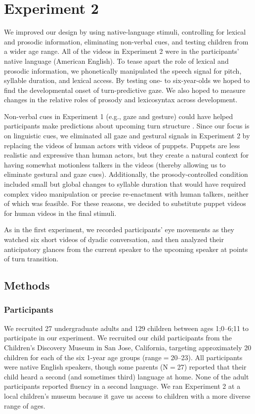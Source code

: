 \documentclass[authoryear, 12pt]{elsarticle}
\begin{document}
\section{Experiment 2}
\label{sec:exp2}

We improved our design by using native-language stimuli, controlling for lexical and prosodic information, eliminating non-verbal cues, and testing children from a wider age range. All of the videos in Experiment 2 were in the participants' native language (American English). To tease apart the role of lexical and prosodic information, we phonetically manipulated the speech signal for pitch, syllable duration, and lexical access. By testing one- to six-year-olds we hoped to find the developmental onset of turn-predictive gaze. We also hoped to measure changes in the relative roles of prosody and lexicosyntax across development.

Non-verbal cues in Experiment 1 (e.g., gaze and gesture) could have helped participants make predictions about upcoming turn structure  \citep{rossano2009, stivers2010}. Since our focus is on linguistic cues, we eliminated all gaze and gestural signals in Experiment 2 by replacing the videos of human actors with videos of puppets. Puppets are less realistic and expressive than human actors, but they create a natural context for having somewhat motionless talkers in the videos (thereby allowing us to eliminate gestural and gaze cues). Additionally, the prosody-controlled condition included small but global changes to syllable duration that would have required complex video manipulation or precise re-enactment with human talkers, neither of which was feasible. For these reasons, we decided to substitute puppet videos for human videos in the final stimuli. 

As in the first experiment, we recorded participants' eye movements as they watched six short videos of dyadic conversation, and then analyzed their anticipatory glances from the current speaker to the upcoming speaker at points of turn transition.

\subsection{Methods}
\label{sec:methods2}

\subsubsection{Participants}
We recruited 27 undergraduate adults and 129 children between ages 1;0--6;11 to participate in our experiment. We recruited our child participants from the Children's Discovery Museum in San Jose, California, targeting approximately 20 children for each of the six 1-year age groups (range$=$20--23). All participants were native English speakers, though some parents (N$=$27) reported that their child heard a second (and sometimes third) language at home. None of the adult participants reported fluency in a second language. We ran Experiment 2 at a local children's museum because it gave us access to children with a more diverse range of ages.
\end{document}
